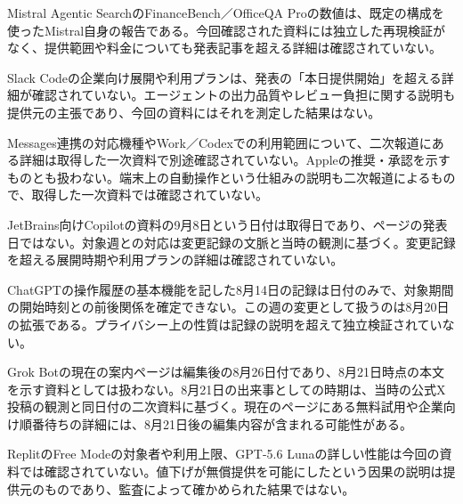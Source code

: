 \begin{claimboundary}
Mistral Agentic SearchのFinanceBench／OfficeQA Proの数値は、既定の構成を使ったMistral自身の報告である。今回確認された資料には独立した再現検証がなく、提供範囲や料金についても発表記事を超える詳細は確認されていない。\autocite{src-a9b696153570}
\end{claimboundary}
\begin{claimboundary}
Slack Codeの企業向け展開や利用プランは、発表の「本日提供開始」を超える詳細が確認されていない。エージェントの出力品質やレビュー負担に関する説明も提供元の主張であり、今回の資料にはそれを測定した結果はない。\autocite{src-648195cc00b1,src-a2492a8b244f}
\end{claimboundary}
\begin{claimboundary}
Messages連携の対応機種やWork／Codexでの利用範囲について、二次報道にある詳細は取得した一次資料で別途確認されていない。Appleの推奨・承認を示すものとも扱わない。端末上の自動操作という仕組みの説明も二次報道によるもので、取得した一次資料では確認されていない。\autocite{src-3930e8dede76}
\end{claimboundary}
\begin{claimboundary}
JetBrains向けCopilotの資料の9月8日という日付は取得日であり、ページの発表日ではない。対象週との対応は変更記録の文脈と当時の観測に基づく。変更記録を超える展開時期や利用プランの詳細は確認されていない。\autocite{src-9f289c801bd1}
\end{claimboundary}
\begin{claimboundary}
ChatGPTの操作履歴の基本機能を記した8月14日の記録は日付のみで、対象期間の開始時刻との前後関係を確定できない。この週の変更として扱うのは8月20日の拡張である。プライバシー上の性質は記録の説明を超えて独立検証されていない。\autocite{src-3930e8dede76}
\end{claimboundary}
\begin{claimboundary}
Grok Botの現在の案内ページは編集後の8月26日付であり、8月21日時点の本文を示す資料としては扱わない。8月21日の出来事としての時期は、当時の公式X投稿の観測と同日付の二次資料に基づく。現在のページにある無料試用や企業向け順番待ちの詳細には、8月21日後の編集内容が含まれる可能性がある。\autocite{src-a68f4a2bcd37}
\end{claimboundary}
\begin{claimboundary}
ReplitのFree Modeの対象者や利用上限、GPT-5.6 Lunaの詳しい性能は今回の資料では確認されていない。値下げが無償提供を可能にしたという因果の説明は提供元のものであり、監査によって確かめられた結果ではない。\autocite{src-2f00013902a2}
\end{claimboundary}
